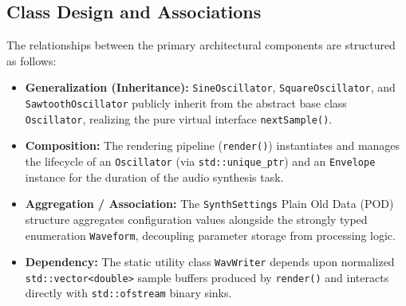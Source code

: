 \documentclass[12pt,a4paper,oneside]{book}
\begin{document}
\subsection{Class Design and Associations}
The relationships between the primary architectural components are structured as follows:
\begin{itemize}
    \item \textbf{Generalization (Inheritance):} \texttt{SineOscillator}, \texttt{SquareOscillator}, and \texttt{SawtoothOscillator} publicly inherit from the abstract base class \texttt{Oscillator}, realizing the pure virtual interface \texttt{nextSample()}.
    \item \textbf{Composition:} The rendering pipeline (\texttt{render()}) instantiates and manages the lifecycle of an \texttt{Oscillator} (via \texttt{std::unique\_ptr}) and an \texttt{Envelope} instance for the duration of the audio synthesis task.
    \item \textbf{Aggregation / Association:} The \texttt{SynthSettings} Plain Old Data (POD) structure aggregates configuration values alongside the strongly typed enumeration \texttt{Waveform}, decoupling parameter storage from processing logic.
    \item \textbf{Dependency:} The static utility class \texttt{WavWriter} depends upon normalized \texttt{std::vector<double>} sample buffers produced by \texttt{render()} and interacts directly with \texttt{std::ofstream} binary sinks.
\end{itemize}
\end{document}
